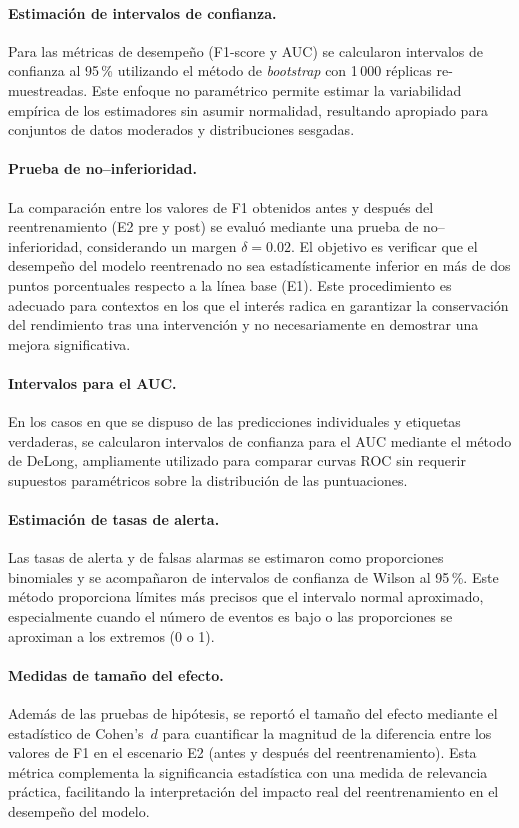\paragraph{Estimación de intervalos de confianza.}
Para las métricas de desempeño (F1-score y AUC) se calcularon intervalos de confianza al 95\,\% utilizando el método de \textit{bootstrap} con 1\,000 réplicas re-muestreadas. Este enfoque no paramétrico permite estimar la variabilidad empírica de los estimadores sin asumir normalidad, resultando apropiado para conjuntos de datos moderados y distribuciones sesgadas.

\paragraph{Prueba de no–inferioridad.}
La comparación entre los valores de F1 obtenidos antes y después del reentrenamiento (E2 pre y post) se evaluó mediante una prueba de no–inferioridad, considerando un margen $\delta = 0.02$. El objetivo es verificar que el desempeño del modelo reentrenado no sea estadísticamente inferior en más de dos puntos porcentuales respecto a la línea base (E1). Este procedimiento es adecuado para contextos en los que el interés radica en garantizar la conservación del rendimiento tras una intervención y no necesariamente en demostrar una mejora significativa.

\paragraph{Intervalos para el AUC.}
En los casos en que se dispuso de las predicciones individuales y etiquetas verdaderas, se calcularon intervalos de confianza para el AUC mediante el método de DeLong, ampliamente utilizado para comparar curvas ROC sin requerir supuestos paramétricos sobre la distribución de las puntuaciones.

\paragraph{Estimación de tasas de alerta.}
Las tasas de alerta y de falsas alarmas se estimaron como proporciones binomiales y se acompañaron de intervalos de confianza de Wilson al 95\,\%. Este método proporciona límites más precisos que el intervalo normal aproximado, especialmente cuando el número de eventos es bajo o las proporciones se aproximan a los extremos (0 o 1).

\paragraph{Medidas de tamaño del efecto.}
Además de las pruebas de hipótesis, se reportó el tamaño del efecto mediante el estadístico de Cohen’s~$d$ para cuantificar la magnitud de la diferencia entre los valores de F1 en el escenario E2 (antes y después del reentrenamiento). Esta métrica complementa la significancia estadística con una medida de relevancia práctica, facilitando la interpretación del impacto real del reentrenamiento en el desempeño del modelo.

